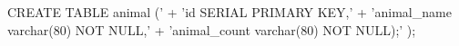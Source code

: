CREATE TABLE animal (' +
'id SERIAL PRIMARY KEY,' +
'animal_name varchar(80) NOT NULL,' +
'animal_count varchar(80) NOT NULL);'
);
